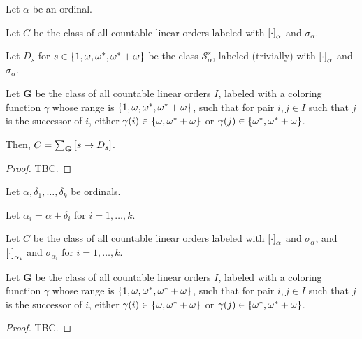 \begin{theorem}
  Let $\alpha$ be an ordinal.

  Let $C$ be the class of
  all countable linear orders labeled
  with $\left[ {\cdot} \right]_{\alpha}$ and $\sigma_{\alpha}$.

  Let $D_s$ for $s \in \left\{ {1, \omega, \omega^\ast, \omega^\ast + \omega} \right\}$ be the
  class $\mathcal{S}^{s}_{\alpha}$,
  labeled (trivially) with $\left[ {\cdot} \right]_{\alpha}$ and $\sigma_{\alpha}$.

  Let $\mathbf{G}$ be the class of all countable linear orders $I$,
  labeled with a coloring function $\gamma$
  whose range is $\left\{ {1, \omega, \omega^\ast, \omega^\ast + \omega} \right\}$,
  such that for pair $i, j \in I$ such that $j$ is the successor of $i$,
  either $\gamma(i) \in \left\{ {\omega, \omega^\ast + \omega} \right\}$
  or $\gamma(j) \in \left\{ {\omega^\ast, \omega^\ast + \omega} \right\}$.

  Then, $C = \sum_{\mathbf{G}} \left[ {s \mapsto D_s} \right]$.
\end{theorem}

\begin{proof}
  TBC.
\end{proof}

\begin{theorem}
  Let $\alpha, \delta_1, \ldots, \delta_k$ be ordinals.

  Let $\alpha_i = \alpha + \delta_i$ for $i = 1, \ldots, k$.

  Let $C$ be the class of all countable linear orders
  labeled with $\left[ {\cdot} \right]_{\alpha}$ and $\sigma_{\alpha}$,
  and $\left[ {\cdot} \right]_{\alpha_i}$ and $\sigma_{\alpha_i}$ for $i = 1, \ldots, k$.

  Let $\mathbf{G}$ be the class of all countable linear orders $I$,
  labeled with a coloring function $\gamma$
  whose range is $\left\{ {1, \omega, \omega^\ast, \omega^\ast + \omega} \right\}$,
  such that for pair $i, j \in I$ such that $j$ is the successor of $i$,
  either $\gamma(i) \in \left\{ {\omega, \omega^\ast + \omega} \right\}$
  or $\gamma(j) \in \left\{ {\omega^\ast, \omega^\ast + \omega} \right\}$.
\end{theorem}

\begin{proof}
  TBC.
\end{proof}